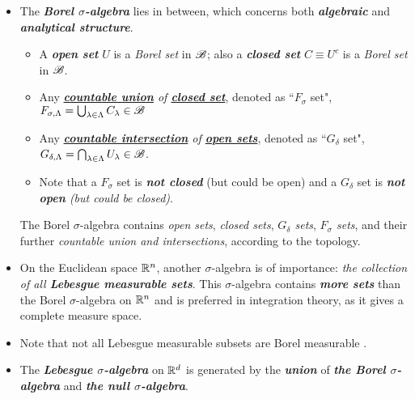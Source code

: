 \documentclass[11pt]{article}
\begin{document}
\begin{itemize}
\item \begin{remark}
The \emph{\textbf{Borel $\sigma$-algebra}} lies in between, which concerns both \emph{\textbf{algebraic}} and \emph{\textbf{analytical structure}}. 
\begin{itemize}
\item A \emph{\textbf{open set}} $U$ is a \emph{Borel set} in ${\mathscr B}$; also a \emph{\textbf{closed set}} $C\equiv U^{c}$ is a \emph{Borel set} in ${\mathscr B}$. 
\item Any \emph{\underline{\textbf{countable union}} of \underline{\textbf{closed set}}}, denoted as ``$F_{\sigma}$ set",  $F_{\sigma, \Lambda}= \bigcup_{\lambda\in \Lambda}C_{\lambda} \in {\mathscr B}$  
\item Any \emph{\underline{\textbf{countable intersection}} of \underline{\textbf{open sets}}}, denoted as ``$G_{\delta}$ set", $G_{\delta, \Lambda}= \bigcap_{\lambda\in \Lambda}U_{\lambda} \in {\mathscr B}$. 
\item Note that a $F_{\sigma}$ set is \emph{\textbf{not closed}} (but could be open) and a $G_{\delta}$ set is \emph{\textbf{not open} (but could be closed)}. 
\end{itemize}
The Borel $\sigma$-algebra contains \emph{open sets}, \emph{closed sets}, \emph{$G_{\delta}$ sets}, \emph{$F_{\sigma}$ sets}, and their further \emph{countable union and intersections}, according to the topology. 
\end{remark}

\item \begin{example}
On the Euclidean space ${\mathbb R}^{n}$, another $\sigma$-algebra is of importance: \emph{the collection of all \textbf{Lebesgue measurable sets}}. This $\sigma$-algebra contains \emph{\textbf{more sets}} than the Borel $\sigma$-algebra on ${\mathbb R}^{n}$ and is preferred in integration theory, as it gives a complete measure space.
\end{example}

\item \begin{remark}
Note that not all Lebesgue measurable subsets are Borel measurable  \citep{tao2011introduction}.
\end{remark}

\item \begin{remark}
The \emph{\textbf{Lebesgue $\sigma$-algebra}} on ${\mathbb R}^d$ is generated by the \emph{\textbf{union}} of \emph{\textbf{the Borel $\sigma$-algebra}} and \emph{\textbf{the null $\sigma$-algebra}}. \citep{tao2011introduction}


\end{remark}
\end{itemize}
\end{document}
